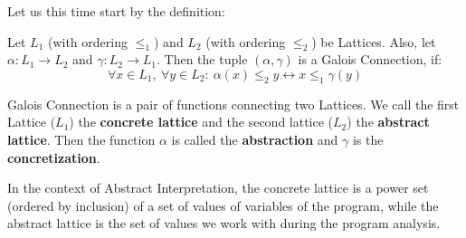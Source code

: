Let us this time start by the definition:

\begin{defn}
    Let $L_1$ (with ordering $\leq _1$) and $L_2$ (with ordering $\leq _2$) be Lattices.
    Also, let $\alpha: L_1 \rightarrow L_2$ and $\gamma: L_2 \rightarrow L_1$.
    Then the tuple $(\alpha, \gamma)$ is a Galois Connection, if:
    \[ \forall x \in L_1, \: \forall y \in L_2: \: \alpha(x) \leq_2 y \leftrightarrow x \leq_1 \gamma(y)\]
\end{defn}

Galois Connection is a pair of functions connecting two Lattices.
We call the first Lattice ($L_1$) the \textbf{concrete lattice} and the second lattice ($L_2$) the \textbf{abstract lattice}.
Then the function $\alpha$ is called the \textbf{abstraction} and $\gamma$ is the \textbf{concretization}.

In the context of Abstract Interpretation, the concrete lattice is a power set (ordered by inclusion) of a set of values
of variables of the program, while the abstract lattice is the set of values we work with during the program analysis.

